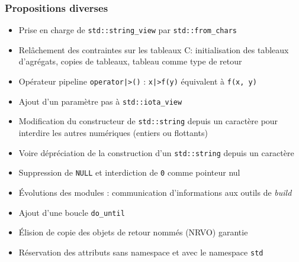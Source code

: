\documentclass[C++.tex]{subfiles}
\begin{document}
\begin{frame}[fragile]
	\frametitle{Propositions diverses}
	\begin{itemize}
		\item Prise en charge de \lstinline|std::string_view| par \lstinline|std::from_chars|
		\item Relâchement des contraintes sur les tableaux \og C\fg{}: initialisation des tableaux d'agrégats, copies de tableaux, tableau comme type de retour


		\item Opérateur pipeline \lstinline!operator|>()! :  \lstinline!x|>f(y)! équivalent à \lstinline|f(x, y)|
		\item Ajout d'un paramètre \og pas\fg{} à \lstinline|std::iota_view|
		\item Modification du constructeur de \lstinline|std::string| depuis un caractère pour interdire les autres numériques (entiers ou flottants)


		\item Voire dépréciation de la construction d'un \lstinline|std::string| depuis un caractère
		\item Suppression de \lstinline|NULL| et interdiction de \lstinline|0| comme pointeur nul
		\item Évolutions des modules : communication d'informations aux outils de \textit{build}
		\item Ajout d'une boucle \lstinline|do_until|
		\item Élision de copie des objets de retour nommés (NRVO) garantie


		\item Réservation des attributs sans namespace et avec le namespace \lstinline|std|


	\end{itemize}
\end{frame}
\end{document}
